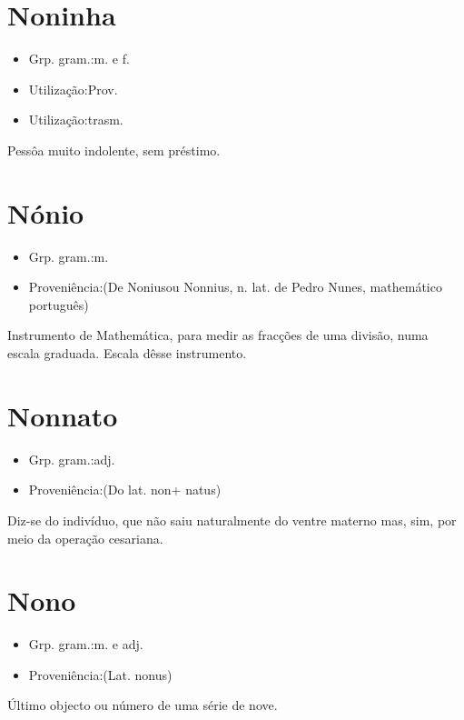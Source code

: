 \section{Noninha}
\begin{itemize}
\item {Grp. gram.:m.  e  f.}
\end{itemize}
\begin{itemize}
\item {Utilização:Prov.}
\end{itemize}
\begin{itemize}
\item {Utilização:trasm.}
\end{itemize}
Pessôa muito indolente, sem préstimo.
\section{Nónio}
\begin{itemize}
\item {Grp. gram.:m.}
\end{itemize}
\begin{itemize}
\item {Proveniência:(De \textunderscore Nonius\textunderscore  ou \textunderscore Nonnius\textunderscore , n. lat. de Pedro Nunes, mathemático português)}
\end{itemize}
Instrumento de Mathemática, para medir as fracções de uma divisão, numa escala graduada.
Escala dêsse instrumento.
\section{Nonnato}
\begin{itemize}
\item {Grp. gram.:adj.}
\end{itemize}
\begin{itemize}
\item {Proveniência:(Do lat. \textunderscore non\textunderscore  + \textunderscore natus\textunderscore )}
\end{itemize}
Diz-se do indivíduo, que não saiu naturalmente do ventre materno mas, sim, por meio da operação cesariana.
\section{Nono}
\begin{itemize}
\item {Grp. gram.:m.  e  adj.}
\end{itemize}
\begin{itemize}
\item {Proveniência:(Lat. \textunderscore nonus\textunderscore )}
\end{itemize}
Último objecto ou número de uma série de nove.
